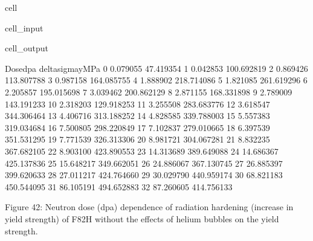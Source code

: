 \documentclass[letterpaper,10pt,english]{jupyterBook}
\begin{document}
\begin{sphinxuseclass}{cell}
\begin{sphinxVerbatimInput}
\begin{sphinxuseclass}{cell_input}
		\end{sphinxuseclass}\end{sphinxVerbatimInput}
		\begin{sphinxVerbatimOutput}
			
			\begin{sphinxuseclass}{cell_output}
				\begin{sphinxVerbatim}[commandchars=\\\{\}]
					Dosedpa  delta\PYGZus{}sigma\PYGZus{}yMPa
					0    0.079055         47.419354
					1    0.042853        100.692819
					2    0.869426        113.807788
					3    0.987158        164.085755
					4    1.888902        218.714086
					5    1.821085        261.619296
					6    2.205857        195.015698
					7    3.039462        200.862129
					8    2.871155        168.331898
					9    2.789009        143.191233
					10   2.318203        129.918253
					11   3.255508        283.683776
					12   3.618547        344.306464
					13   4.406716        313.188252
					14   4.828585        339.788003
					15   5.557383        319.034684
					16   7.500805        298.220849
					17   7.102837        279.010665
					18   6.397539        351.531295
					19   7.771539        326.313306
					20   8.981721        304.067281
					21   8.832235        367.682105
					22   8.903100        423.890553
					23  14.313689        389.649088
					24  14.686367        425.137836
					25  15.648217        349.662051
					26  24.886067        367.130745
					27  26.885397        399.620633
					28  27.011217        424.764660
					29  30.029790        440.959174
					30  68.821183        450.544095
					31  86.105191        494.652883
					32  87.260605        414.756133
				\end{sphinxVerbatim}
				
				\noindent{}
				
		\end{sphinxuseclass}\end{sphinxVerbatimOutput}
		
	\end{sphinxuseclass}
	\sphinxAtStartPar
	Figure 42: Neutron dose (dpa) dependence of radiation hardening (increase in yield strength) of F82H without the effects of helium bubbles on the yield strength.
	
\end{document}
